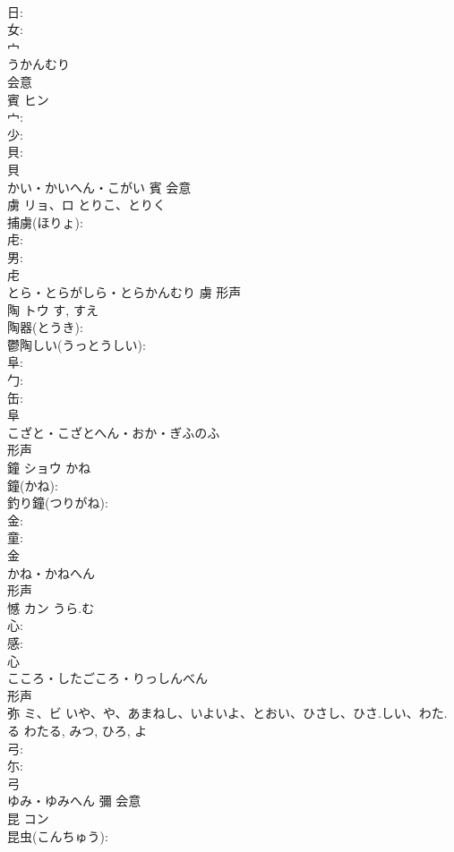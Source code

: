 \documentclass[8pt]{extreport}
\begin{document}
\begin{CJK}{UTF8}{min}
\\	日: 
\\	女: 
\\	宀	
\\	うかんむり	
\\	会意 
\\	賓	ヒン			
\\	宀: 
\\	少: 
\\	貝: 
\\	貝	
\\	かい・かいへん・こがい	賓	会意 
\\	虜	リョ、ロ	とりこ、とりく		
\\	捕虜(ほりょ): 
\\	虍: 
\\	男: 
\\	虍	
\\	とら・とらがしら・とらかんむり	虜	形声 
\\	陶	トウ		す, すえ	
\\	陶器(とうき): 
\\	鬱陶しい(うっとうしい): 
\\	阜: 
\\	勹: 
\\	缶: 
\\	阜	
\\	こざと・こざとへん・おか・ぎふのふ	
\\	形声 
\\	鐘	ショウ	かね		
\\	鐘(かね): 
\\	釣り鐘(つりがね): 
\\	金: 
\\	童: 
\\	金	
\\	かね・かねへん	
\\	形声 
\\	憾	カン	うら.む		
\\	心: 
\\	感: 
\\	心	
\\	こころ・したごころ・りっしんべん	
\\	形声 
\\	弥	ミ、ビ	いや、や、あまねし、いよいよ、とおい、ひさし、ひさ.しい、わた.る	わたる, みつ, ひろ, よ	
\\	弓: 
\\	尓: 
\\	弓	
\\	ゆみ・ゆみへん	彌	会意 
\\	昆	コン			
\\	昆虫(こんちゅう): 

\end{CJK}
\end{document}
